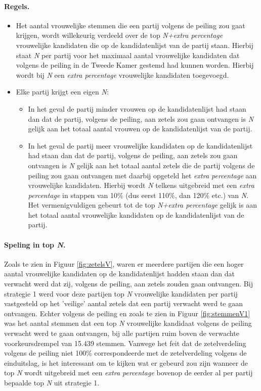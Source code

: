 \paragraph{Regels.}
\begin{itemize}
	\item
Het aantal vrouwelijke stemmen die een partij volgens de peiling zou gaat krijgen, wordt willekeurig verdeeld over de top \textit{N+extra percentage} vrouwelijke kandidaten die op de kandidatenlijst van de partij staan. Hierbij staat \textit{N} per partij voor het maximaal aantal vrouwelijke kandidaten dat volgens de peiling in de Tweede Kamer gestemd had kunnen worden. Hierbij wordt bij \textit{N} een \textit{extra percentage} vrouwelijke kandidaten toegevoegd.\\
 	\item
Elke partij krijgt een eigen \textit{N}:
	\begin{itemize}
		\item
In het geval de partij minder vrouwen op de kandidatenlijst had staan dan dat de partij, volgens de peiling, aan zetels zou gaan ontvangen is \textit{N} gelijk aan het totaal aantal vrouwen op de kandidatenlijst van de partij.
		\item
In het geval de partij meer vrouwelijke kandidaten op de kandidatenlijst had staan dan dat de partij, volgens de peiling, aan zetels zou gaan ontvangen is \textit{N} gelijk aan het totaal aantal zetels die de partij volgens de peiling zou gaan ontvangen met daarbij opgeteld het \textit{extra percentage} aan vrouwelijke kandidaten. Hierbij wordt \textit{N} telkens uitgebreid met een \textit{extra percentage} in stappen van 10\% (dus eerst 110\%, dan 120\% etc.) van \textit{N}. Het vermenigvuldigen gebeurt tot de top \textit{N+extra percentage} gelijk is aan het totaal aantal vrouwelijke kandidaten op de kandidatenlijst van de partij. 
\end{itemize} 	
\end{itemize}

\paragraph{Speling in top \textit{N}.}
Zoals te zien in Figuur \ref{fig:zetelsV}, waren er meerdere partijen die een hoger aantal vrouwelijke kandidaten op de kandidatenlijst hadden staan dan dat verwacht werd dat zij,  volgens de peiling, aan zetels zouden gaan ontvangen. Bij strategie 1 werd voor deze partijen top \textit{N} vrouwelijke kandidaten per partij vastgesteld op het 'veilige' aantal zetels dat een partij verwacht werd te gaan ontvangen. Echter volgens de peiling en zoals te zien in Figuur \ref{fig:stemmenV1} was het aantal stemmen dat een top \textit{N} vrouwelijke kandidaat volgens de peiling verwacht werd te gaan ontvangen, bij alle partijen ruim boven de verwachte voorkeursdrempel van 15.439 stemmen. Vanwege het feit dat de zetelverdeling volgens de peiling niet 100\% correspondeerde met de zetelverdeling volgens de einduitslag, is het interessant om te kijken wat er gebeurd zou zijn wanneer de top \textit{N} wordt uitgebreid met een \textit{extra percentage} bovenop de eerder al per partij bepaalde top \textit{N} uit strategie 1. 


